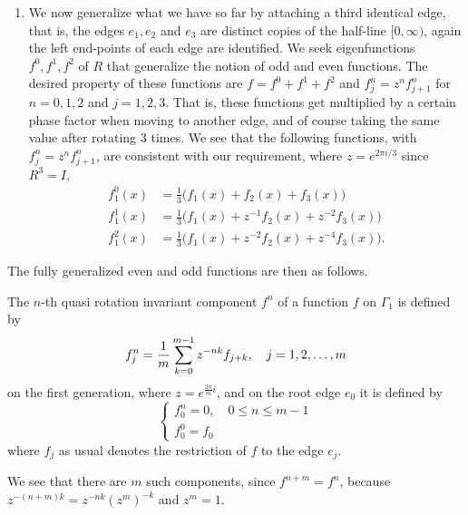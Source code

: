 \begin{example}
\begin{enumerate}[\itshape (i)]
    \item
    We now generalize what we have so far by attaching a third identical edge, that is, the edges $e_1, e_2$ and $e_3$ are distinct copies of the half-line $[0, \infty)$, again the left end-points of each edge are identified. We seek eigenfunctions $f^0, f^1, f^2$ of $R$ that generalize the notion of odd and even functions. The desired property of these functions are $f = f^0 + f^1 + f^2$ and $f^n_j = z^n f^n_{j+1}$ for $n = 0, 1, 2$ and $j = 1, 2, 3$. That is, these functions get multiplied by a certain phase factor when moving to another edge, and of course taking the same value after rotating 3 times. We see that the following functions, with $f^n_j = z^n f^n_{j+1}$, are consistent with our requirement, where $z = e^{2 \pi i / 3}$ since $R^3=I$,
    \begin{align*}
      f^0_1(x) &= \frac{1}{3} \big( f_1(x) + f_2(x) + f_3(x) \big) \\
      f^1_1(x) &= \frac{1}{3} \big( f_1(x) + z^{-1} f_2(x) + z^{-2} f_3(x) \big) \\
      f^2_1(x) &= \frac{1}{3} \big( f_1(x) + z^{-2} f_2(x) + z^{-4} f_3(x) \big).
    \end{align*}
  \end{enumerate}
\end{example}

The fully generalized even and odd functions are then as follows.

\begin{definition}
  The $n$-th quasi rotation invariant component $f^n$ of a function $f$ on $\Gamma_1$ is defined by
  \begin{equation}\label{eq: quasi rotation invariant component}
      f^n_j = \frac{1}{m} \sum_{k=0}^{m-1} z^{-nk} f_{j+k}, \quad j = 1, 2, \ldots, m \\
  \end{equation}
  on the first generation, where $z=e^{\frac{2\pi}{m}i}$, and on the root edge $e_0$ it is defined by
  \[
    \begin{cases}
      f^n_0 = 0, \quad 0 \le n \le m-1 \\
      f^0_0 = f_0
    \end{cases}
  \]
  where $f_j$ as usual denotes the restriction of $f$ to the edge $e_j$.
\end{definition}

We see that there are $m$ such components, since $f^{n+m} = f^{n}$, because $z^{-(n+m)k} = z^{-nk}(z^m)^{-k}$ and $z^m=1$.

